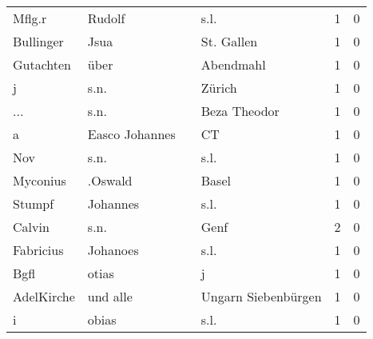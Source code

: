 \begin{center}
\begin{tiny}
\begin{longtabu}{llllrr}
                   Mflg.r &                             Rudolf &             &                                        s.l. &          1 &         0 \\
                Bullinger &                               Jsua &             &                                  St. Gallen &          1 &         0 \\
                Gutachten &                               über &             &                                   Abendmahl &          1 &         0 \\
                        j &                               s.n. &             &                                      Zürich &          1 &         0 \\
                      ... &                               s.n. &             &                                Beza Theodor &          1 &         0 \\
                        a &                     Easco Johannes &             &                                          CT &          1 &         0 \\
                      Nov &                               s.n. &             &                                        s.l. &          1 &         0 \\
                 Myconius &                            .Oswald &             &                                       Basel &          1 &         0 \\
                   Stumpf &                           Johannes &             &                                        s.l. &          1 &         0 \\
                   Calvin &                               s.n. &             &                                        Genf &          2 &         0 \\
                Fabricius &                           Johanoes &             &                                        s.l. &          1 &         0 \\
                     Bgfl &                              otias &             &                                           j &          1 &         0 \\
               AdelKirche &                           und alle &             &                         Ungarn Siebenbürgen &          1 &         0 \\
                        i &                              obias &             &                                        s.l. &          1 &         0 \\

\end{longtabu}
\end{tiny}
\end{center}
